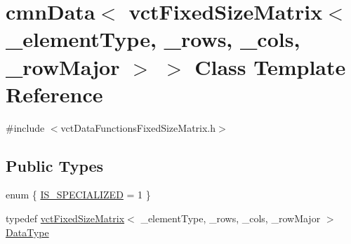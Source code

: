 \hypertarget{classcmn_data_3_01vct_fixed_size_matrix_3_01__element_type_00_01__rows_00_01__cols_00_01__row_major_01_4_01_4}{}\section{cmn\+Data$<$ vct\+Fixed\+Size\+Matrix$<$ \+\_\+element\+Type, \+\_\+rows, \+\_\+cols, \+\_\+row\+Major $>$ $>$ Class Template Reference}
\label{classcmn_data_3_01vct_fixed_size_matrix_3_01__element_type_00_01__rows_00_01__cols_00_01__row_major_01_4_01_4}


{\ttfamily \#include $<$vct\+Data\+Functions\+Fixed\+Size\+Matrix.\+h$>$}

\subsection*{Public Types}
\begin{DoxyCompactItemize}
\item 
enum \{ \hyperlink{classcmn_data_3_01vct_fixed_size_matrix_3_01__element_type_00_01__rows_00_01__cols_00_01__row_major_01_4_01_4_a7bfca2e5f37f76366040c33d76a84f5dae5084c557350696eaba83eb9bbb3c29f}{I\+S\+\_\+\+S\+P\+E\+C\+I\+A\+L\+I\+Z\+E\+D} = 1
 \}
\item 
typedef \hyperlink{classvct_fixed_size_matrix}{vct\+Fixed\+Size\+Matrix}$<$ \+\_\+element\+Type, \+\_\+rows, \+\_\+cols, \+\_\+row\+Major $>$ \hyperlink{classcmn_data_3_01vct_fixed_size_matrix_3_01__element_type_00_01__rows_00_01__cols_00_01__row_major_01_4_01_4_a6b06110fd1bb7049b72ce21275dd8aee}{Data\+Type}
\end{DoxyCompactItemize}
